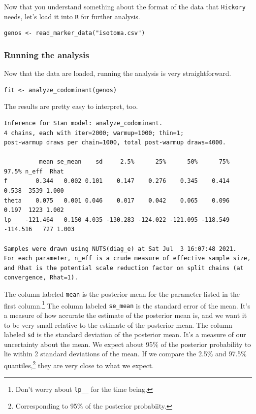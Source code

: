 Now that you understand something about the format of the data that
{\tt Hickory} needs, let's load it into {\tt R} for further analysis.

\begin{verbatim}
genos <- read_marker_data("isotoma.csv")
\end{verbatim}

\subsubsection*{Running the analysis}

Now that the data are loaded, running the analysis is very
straightforward.

\begin{verbatim}
fit <- analyze_codominant(genos)
\end{verbatim}
The results are pretty easy to interpret, too.
{\small
\begin{verbatim}
Inference for Stan model: analyze_codominant.
4 chains, each with iter=2000; warmup=1000; thin=1; 
post-warmup draws per chain=1000, total post-warmup draws=4000.

          mean se_mean    sd     2.5%      25%      50%      75%    97.5% n_eff  Rhat
f        0.344   0.002 0.101    0.147    0.276    0.345    0.414    0.538  3539 1.000
theta    0.075   0.001 0.046    0.017    0.042    0.065    0.096    0.197  1223 1.002
lp__  -121.464   0.150 4.035 -130.283 -124.022 -121.095 -118.549 -114.516   727 1.003

Samples were drawn using NUTS(diag_e) at Sat Jul  3 16:07:48 2021.
For each parameter, n_eff is a crude measure of effective sample size,
and Rhat is the potential scale reduction factor on split chains (at 
convergence, Rhat=1).
\end{verbatim}
}
The column labeled {\tt mean} is the posterior mean for the parameter
listed in the first column.\footnote{Don't worry about {\tt lp\_\_}
for the time being.} The column labeled {\tt se\_mean} is the standard
error of the mean. It's a measure of how accurate the estimate of the
posterior mean is, and we want it to be very small relative to the
estimate of the posterior mean. The column labeled {\tt sd} is the
standard deviation of the posterior mean. It's a measure of our
uncertainty about the mean. We expect about 95\% of the posterior
probability to lie within 2 standard deviations of the mean. If we
compare the 2.5\% and 97.5\% quantiles,\footnote{Corresponding to 95\%
  of the posterior probabiity.} they are very close to what we expect.

